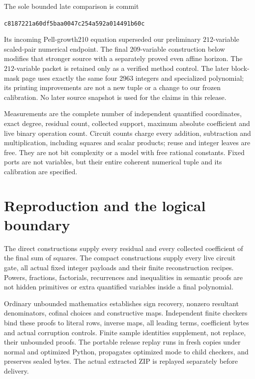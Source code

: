 \documentclass[11pt]{article}
\theoremstyle{definition}\newtheorem{definition}[theorem]{Definition}
\theoremstyle{remark}\newtheorem{remark}[theorem]{Remark}
\begin{document}
The sole bounded late comparison is commit
\begin{center}\small\texttt{c8187221a60df5baa0047c254a592a014491b60c}\end{center}
Its incoming Pell-growth210 equation superseded our preliminary
$212$-variable scaled-pair numerical endpoint. The final $209$-variable
construction below modifies that stronger source with a separately proved
even affine horizon. The $212$-variable packet is retained only as a
verified method control. The later block-mask page uses exactly the same
four 2963 integers and specialized polynomial; its printing improvements
are not a new tuple or a change to our frozen calibration. No later source
snapshot is used for the claims in this release.

Measurements are the complete number of independent quantified coordinates,
exact degree, residual count, collected support, maximum absolute coefficient
and live binary operation count. Circuit counts charge every addition,
subtraction and multiplication, including squares and scalar products;
reuse and integer leaves are free. They are not bit complexity or a model
with free rational constants. Fixed ports are not variables, but their
entire coherent numerical tuple and its calibration are specified.






\section{Reproduction and the logical boundary}
The direct constructions supply every residual and every collected
coefficient of the final sum of squares. The compact constructions supply
every live circuit gate, all actual fixed integer payloads and their finite
reconstruction recipes. Powers, fractions, factorials, recurrences and
inequalities in semantic proofs are not hidden primitives or extra
quantified variables inside a final polynomial.

Ordinary unbounded mathematics establishes sign recovery, nonzero
resultant denominators, cofinal choices and constructive maps. Independent
finite checkers bind these proofs to literal rows, inverse maps, all leading
terms, coefficient bytes and actual corruption controls. Finite sample
identities supplement, not replace, their unbounded proofs. The portable
release replay runs in fresh copies under normal and optimized Python,
propagates optimized mode to child checkers, and preserves sealed bytes.
The actual extracted ZIP is replayed separately before delivery.
\end{document}
